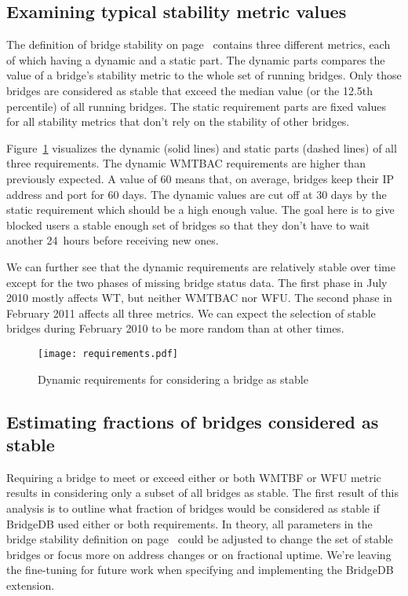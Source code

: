 \documentclass{article}
\begin{document}
\subsection{Examining typical stability metric values}
\label{sec:requirements}

The definition of bridge stability on page~\pageref{sec:defining} contains
three different metrics, each of which having a dynamic and a static part.
The dynamic parts compares the value of a bridge's stability metric to the
whole set of running bridges.
Only those bridges are considered as stable that exceed the median value
(or the 12.5th percentile) of all running bridges.
The static requirement parts are fixed values for all stability metrics
that don't rely on the stability of other bridges.

Figure~\ref{fig:requirements} visualizes the dynamic (solid lines) and
static parts (dashed lines) of all three requirements.
The dynamic WMTBAC requirements are higher than previously expected.
A value of 60 means that, on average, bridges keep their IP address and
port for 60 days.
The dynamic values are cut off at 30 days by the static requirement which
should be a high enough value.
The goal here is to give blocked users a stable enough set of bridges so
that they don't have to wait another 24~hours before receiving new ones.

We can further see that the dynamic requirements are relatively stable
over time except for the two phases of missing bridge status data.
The first phase in July 2010 mostly affects WT, but neither WMTBAC nor
WFU.
The second phase in February 2011 affects all three metrics.
We can expect the selection of stable bridges during February 2010 to be
more random than at other times.

\begin{figure}[t]
\texttt{[image: requirements.pdf]}
\caption{Dynamic requirements for considering a bridge as stable}
\label{fig:requirements}
\end{figure}

\subsection{Estimating fractions of bridges considered as stable}
\label{sec:fractions}

Requiring a bridge to meet or exceed either or both WMTBF or WFU metric
results in considering only a subset of all bridges as stable.
The first result of this analysis is to outline what fraction of bridges
would be considered as stable if BridgeDB used either or both
requirements.
In theory, all parameters in the bridge stability definition on
page~\pageref{def:bridgestability} could be adjusted to change the set of
stable bridges or focus more on address changes or on fractional uptime.
We're leaving the fine-tuning for future work when specifying and
implementing the BridgeDB extension.
\end{document}
